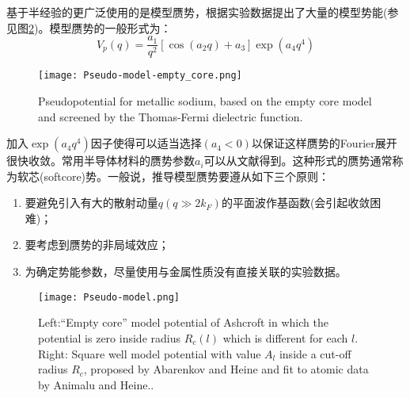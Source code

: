 基于半经验的更广泛使用的是模型赝势，根据实验数据提出了大量的模型势能\cite{PM9-451_1964,PM12-529_1965,JPF2-270_1972,PRB11-2717_1975,PRB11-2726_1975,JPF6-L271_1976,PR174-769_1968}(参见图\ref{Pseudo-model})。模型赝势的一般形式为：
\begin{equation}
  V_p(q)=\frac{a_1}{q^2}[\cos(a_2q)+a_3]\exp(a_4q^4)
  \label{eq:solid-102}
\end{equation}
\begin{figure}[h!]
\centering
\texttt{[image: Pseudo-model-empty\_core.png]}
\caption{\small \textrm{Pseudopotential for metallic sodium, based on the empty core model and screened by the Thomas-Fermi dielectric function.}}%
\label{Pseudo_model-empty_core}
\end{figure}
加入$\exp(a_4q^4)$因子使得可以适当选择$(a_4<0)$以保证这样赝势的Fourier展开很快收敛。常用半导体材料的赝势参数$a_i$可以从文献\cite{PRB15-2154_1977}得到。这种形式的赝势通常称为软芯(softcore)势。一般说，推导模型赝势要遵从如下三个原则：
\begin{enumerate}
  \item 
要避免引入有大的散射动量$q(q\gg 2k_F)$的平面波作基函数(会引起收敛困难)；%
  \item 
要考虑到赝势的非局域效应；
  \item 
为确定势能参数，尽量使用与金属性质没有直接关联的实验数据。
\end{enumerate}
\begin{figure}[h!]
\centering
\texttt{[image: Pseudo-model.png]}
\caption{\small \textrm{Left:``Empty core'' model potential of Ashcroft in which the potential is zero inside radius $R_c(l)$ which is different for each $l$. Right: Square well model potential with value $A_l$ inside a cut-off radius $R_c$, proposed by Abarenkov and Heine and fit to atomic data by Animalu and Heine..}}%
\label{Pseudo-model}
\end{figure}

